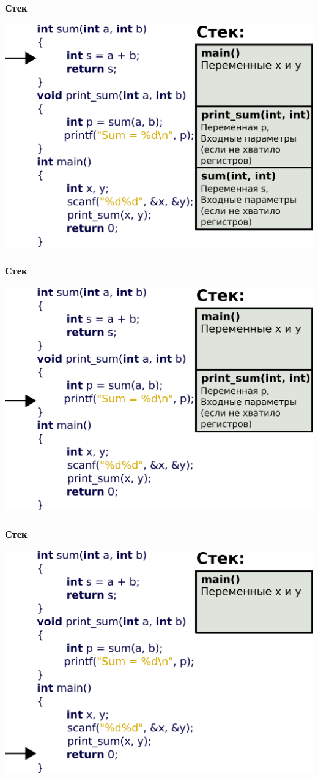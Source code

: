 \documentclass[12pt,pdf,hyperref={unicode}]{beamer}
\begin{document}
\begin{frame}[fragile]
\frametitle{Стек} 
\begin{center}
\includegraphics[width=\linewidth]{images/stack3.png}
\end{center}
\end{frame}

\begin{frame}[fragile]
\frametitle{Стек} 
\begin{center}
\includegraphics[width=\linewidth]{images/stack4.png}
\end{center}
\end{frame}

\begin{frame}[fragile]
\frametitle{Стек} 
\begin{center}
\includegraphics[width=\linewidth]{images/stack5.png}
\end{center}
\end{frame}
\end{document}
